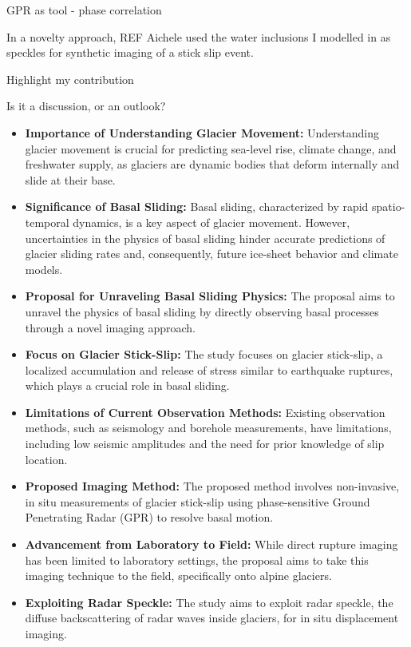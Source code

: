 GPR as tool - phase correlation

In a novelty approach, REF Aichele used the water inclusions I modelled in \cite{Ogier&al2023} as speckles for synthetic imaging of a stick slip event.

Highlight my contribution

Is it a discussion, or an outlook?



\begin{itemize}
    \item \textbf{Importance of Understanding Glacier Movement:} Understanding glacier movement is crucial for predicting sea-level rise, climate change, and freshwater supply, as glaciers are dynamic bodies that deform internally and slide at their base.
    \item \textbf{Significance of Basal Sliding:} Basal sliding, characterized by rapid spatio-temporal dynamics, is a key aspect of glacier movement. However, uncertainties in the physics of basal sliding hinder accurate predictions of glacier sliding rates and, consequently, future ice-sheet behavior and climate models.
    \item \textbf{Proposal for Unraveling Basal Sliding Physics:} The proposal aims to unravel the physics of basal sliding by directly observing basal processes through a novel imaging approach.
    \item \textbf{Focus on Glacier Stick-Slip:} The study focuses on glacier stick-slip, a localized accumulation and release of stress similar to earthquake ruptures, which plays a crucial role in basal sliding.
    \item \textbf{Limitations of Current Observation Methods:} Existing observation methods, such as seismology and borehole measurements, have limitations, including low seismic amplitudes and the need for prior knowledge of slip location.
    \item \textbf{Proposed Imaging Method:} The proposed method involves non-invasive, in situ measurements of glacier stick-slip using phase-sensitive Ground Penetrating Radar (GPR) to resolve basal motion.
    \item \textbf{Advancement from Laboratory to Field:} While direct rupture imaging has been limited to laboratory settings, the proposal aims to take this imaging technique to the field, specifically onto alpine glaciers.
    \item \textbf{Exploiting Radar Speckle:} The study aims to exploit radar speckle, the diffuse backscattering of radar waves inside glaciers, for in situ displacement imaging.

\end{itemize}
